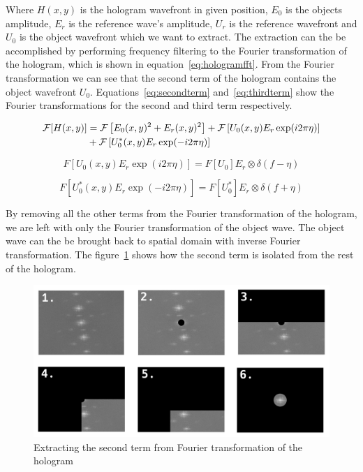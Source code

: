 \documentclass[12pt,a4paper,english
]{tunithesis}
\begin{document}
Where $H(x,y)$ is the hologram wavefront in given position, $E_0$ is the objects amplitude, $E_r$ is the reference wave's amplitude, $U_r$ is the reference wavefront and $U_0$ is the object wavefront which we want to extract. The extraction can the be accomplished by performing frequency filtering to the Fourier transformation of the hologram, which is shown in equation~\ref{eq:hologramfft}. From the Fourier transformation we can see that the second term of the hologram contains the object wavefront $U_0$. Equations~\ref{eq:secondterm} and~\ref{eq:thirdterm} show the Fourier transformations for the second and third term respectively.

\begin{align}
\mathcal{F}[H(x, y)] &= \mathcal{F}\left[E_0(x, y)^2 + E_r(x, y)^2\right] + \mathcal{F}\left[U_0(x, y)E_r \exp(i2\pi\eta)\right] \notag \\
& + \mathcal{F}\left[U_0^*(x, y)E_r \exp(-i2\pi\eta)\right]
\label{eq:hologramfft}
\end{align}

\begin{equation}
F [U_0(x, y)E_r \exp(i2\pi\eta)] = F [U_0] E_r \otimes \delta(f - \eta)
\label{eq:secondterm}
\end{equation}

\begin{equation}
F [U_0^*(x, y)E_r \exp(-i2\pi\eta)] = F [U_0^*] E_r \otimes \delta(f + \eta)
\label{eq:thirdterm}
\end{equation}

By removing all the other terms from the Fourier transformation of the hologram, we are left with only the Fourier transformation of the object wave. The object wave can the be brought back to spatial domain with inverse Fourier transformation. The figure~\ref{fig:fourierfiltering} shows how the second term is isolated from the rest of the hologram.

\begin{figure}
  \centering
  \includegraphics[width=\columnwidth]{img/filter_process.png}
  \caption{Extracting the second term from Fourier transformation of the hologram}
  \label{fig:fourierfiltering}
\end{figure}
\end{document}
